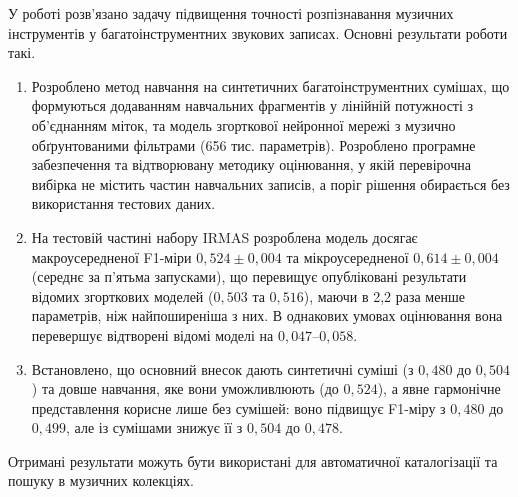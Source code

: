 
У роботі розв'язано задачу підвищення точності розпізнавання музичних
інструментів у багатоінструментних звукових записах. Основні результати
роботи такі.

\begin{enumerate}
    \item Розроблено метод навчання на синтетичних багатоінструментних
    сумішах, що формуються додаванням навчальних фрагментів у лінійній
    потужності з об'єднанням міток, та модель згорткової нейронної мережі
    з музично обґрунтованими фільтрами (656 тис. параметрів). Розроблено
    програмне забезпечення та відтворювану методику оцінювання, у якій
    перевірочна вибірка не містить частин навчальних записів, а поріг
    рішення обирається без використання тестових даних.

    \item На тестовій частині набору IRMAS розроблена модель досягає
    макроусередненої F1-міри $0{,}524 \pm 0{,}004$ та мікроусередненої
    $0{,}614 \pm 0{,}004$ (середнє за п'ятьма запусками), що перевищує
    опубліковані результати відомих згорткових моделей ($0{,}503$ та
    $0{,}516$), маючи в 2,2 раза менше параметрів, ніж найпоширеніша з
    них. В однакових умовах
    оцінювання вона перевершує відтворені відомі моделі на $0{,}047$--$0{,}058$.

    \item Встановлено, що основний внесок дають синтетичні суміші (з
    $0{,}480$ до $0{,}504$) та довше навчання, яке вони уможливлюють (до
    $0{,}524$), а явне гармонічне представлення корисне лише без сумішей:
    воно підвищує F1-міру з $0{,}480$ до $0{,}499$, але із сумішами знижує
    її з $0{,}504$ до $0{,}478$.
\end{enumerate}

Отримані результати можуть бути використані для автоматичної
каталогізації та пошуку в музичних колекціях.
